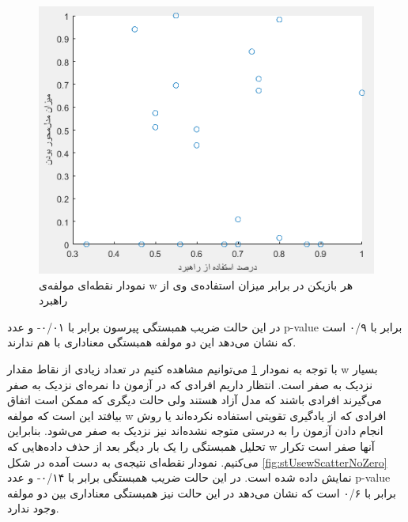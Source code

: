\documentclass[twoside, a4paper,11pt]{book}
\numberwithin{equation}{chapter}
\numberwithin{table}{chapter}
\numberwithin{figure}{chapter}
\numberwithin{equation}{chapter}
\begin{document}
\begin{figure}
\centering
\includegraphics[scale=0.8]{Figures/stUsewScatter.png}
\caption{\label{fig:stUsewScatter}
نمودار نقطه‌ای مولفه‌ی w هر بازیکن در برابر میزان استفاده‌ی وی از راهبرد
}
\end{figure}

در این حالت ضریب همبستگی پیرسون برابر با ۰/۰۱- و عدد p-value برابر با ۰/۹ است که نشان می‌دهد این دو مولفه همبستگی معناداری با هم ندارند.

با توجه به نمودار \ref{fig:stUsewScatter} می‌توانیم مشاهده کنیم در تعداد زیادی از نقاط مقدار w بسیار نزدیک به صفر است. انتظار داریم افرادی که در آزمون دا نمره‌ای نزدیک به صفر می‌گیرند افرادی باشند که مدل آزاد هستند ولی حالت دیگری که ممکن است اتفاق بیافتد این است که مولفه w افرادی که از یادگیری تقویتی استفاده نکرده‌اند یا روش انجام دادن آزمون را به درستی متوجه نشده‌اند نیز نزدیک به صفر می‌شود. بنابراین تحلیل همبستگی را یک بار دیگر بعد از حذف داده‌هایی که w آنها صفر است تکرار می‌کنیم. نمودار نقطه‌ای نتیجه‌ی به دست آمده در شکل \ref{fig:stUsewScatterNoZero} نمایش داده شده است. در این حالت ضریب همبستگی برابر با ۰/۱۴- و عدد p-value برابر با ۰/۶ است که نشان می‌دهد در این حالت نیز همبستگی معناداری بین دو مولفه وجود ندارد.
\end{document}
